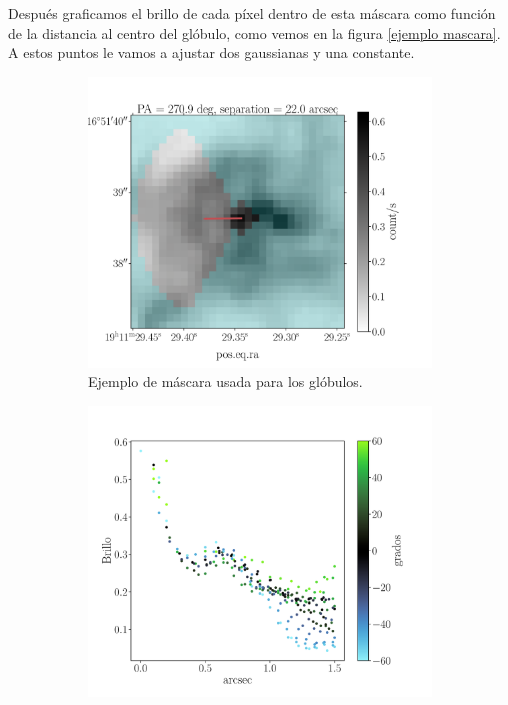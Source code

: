 \documentclass{book}
\begin{document}
Después graficamos el brillo de cada píxel dentro de esta máscara como función de la distancia al centro del glóbulo, como vemos en la figura \ref{ejemplo mascara}. A estos puntos le vamos a ajustar dos gaussianas y una constante.


\begin{figure}[htb]
  \begin{subfigure}[b]{0.5\textwidth}
    \includegraphics[width=\textwidth, height=0.9\textwidth]{Nuevas imagenes finales/F_4_1_A.pdf}
    \caption{Ejemplo de máscara usada para los glóbulos.}
    \label{fig:f1}
  \end{subfigure}
  \hfill
  \begin{subfigure}[b]{0.5\textwidth}
    \includegraphics[width=\textwidth, height=0.9\textwidth]{Nuevas imagenes finales/F_4_1_B.pdf}

\end{subfigure}
\end{figure}
\end{document}
